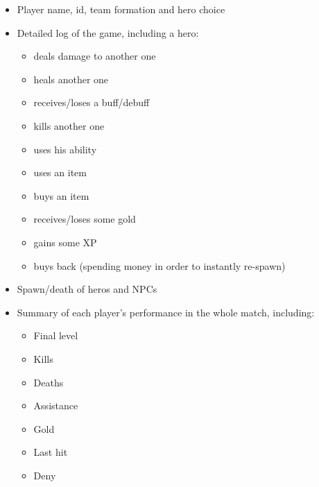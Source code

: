 \documentclass{article}
\begin{document}
\begin{itemize}
	\item Player name, id, team formation and hero choice
	\item Detailed log of the game, including a hero:
	\begin{itemize}
		\item deals damage to another one
		\item heals another one
		\item receives/loses a buff/debuff
		\item kills another one
		\item uses his ability
		\item uses an item
		\item buys an item
		\item receives/loses some gold
		\item gains some XP
		\item buys back (spending money in order to instantly re-spawn)
	\end{itemize}
	\item Spawn/death of heros and NPCs
	\item Summary of each player's performance in the whole match, including:
	\begin{itemize}
		\item Final level
		\item Kills
		\item Deaths
		\item Assistance
		\item Gold
		\item Last hit
		\item Deny
	\end{itemize}
\end{itemize}






\end{document}
